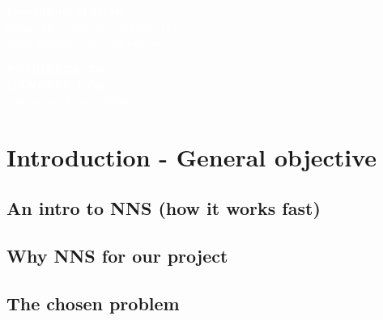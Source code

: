 \documentclass{article}
\begin{document}
\pagecolor{darkbluegrey}
\afterpage{\nopagecolor}


\begin{titlepage}
    \begin{center}
        \textcolor{white}{\textbf{\Huge Description of Work}}\\ %
        \vspace{1cm}
        \textcolor{white}{\Large Sound Detection and Classification\\using Spiking Neural Networks} %
        \vspace{3cm}
    \end{center}
    \begin{center}
        \textcolor{white}{ %
            \textbf{COURREGE Téo}\\
            \textbf{GANDEEL Lo'aï}\\
            \vspace{1cm}
            \Large Submission Date: \today}
    \end{center}
\end{titlepage}

\newpage

\tableofcontents

\section{Introduction - General objective}


\subsection{An intro to NNS (how it works fast)}

\subsection{Why NNS for our project}

\subsection{The chosen problem}
\end{document}
